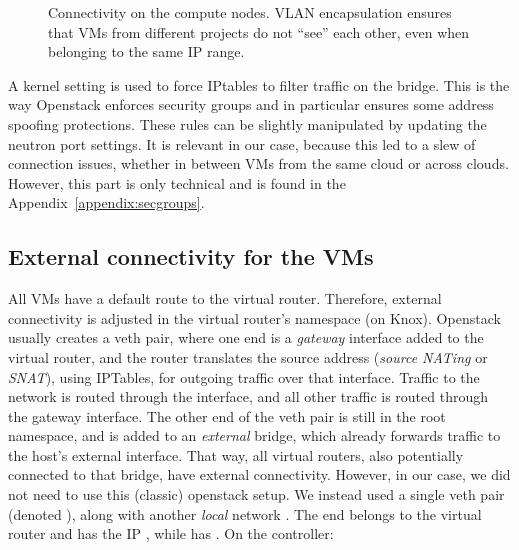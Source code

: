 
\begin{figure}[ht]%
  \centering
  
  \caption{Connectivity on the compute nodes. VLAN encapsulation
    ensures that VMs from different projects do not ``see'' each
    other, even when belonging to the same IP range.}
  \label{figure:connectivity:compute:nodes}
\end{figure}

A kernel setting is used to force IPtables to filter traffic on the
bridge. This is the way Openstack enforces security groups and in
particular ensures some address spoofing protections. These rules can
be slightly manipulated by updating the neutron port settings.
%
It is relevant in our case, because this led to a slew of connection
issues, whether in between VMs from the same cloud or across
clouds. However, this part is only technical and is found in the
Appendix~\ref{appendix:secgroups}.


\subsection{External connectivity for the VMs}
\label{section:implementation:external:connectivity}

All VMs have a default route to the virtual router. Therefore,
external connectivity is adjusted in the virtual router's namespace
(on Knox).
%
Openstack usually creates a veth pair, where one end is a
\emph{gateway} interface added to the virtual router, and the router
translates the source address (\emph{source NATing} or \emph{SNAT}),
using IPTables, for outgoing traffic over that interface. Traffic to
the  network is routed through the
 interface, and all other traffic is routed through
the gateway interface.
%
The other end of the veth pair is still in the root namespace, and is
added to an \emph{external} bridge, which already forwards traffic to
the host's external interface. That way, all virtual routers, also
potentially connected to that bridge, have external connectivity.
%
However, in our case, we did not need to use this (classic) openstack
setup. We instead used a single veth pair (denoted
), along with another \emph{local} network
. The  end belongs to the virtual router
and has the IP , while  has .
%
On the controller:

